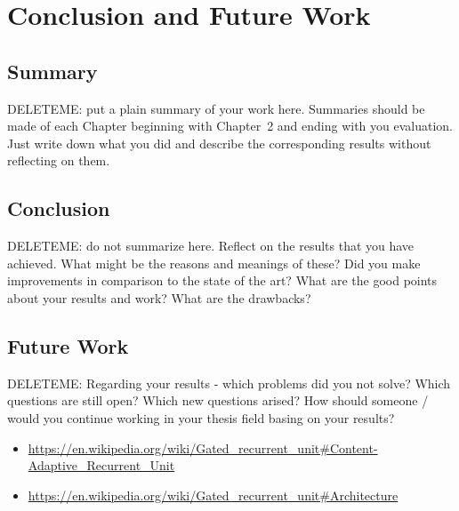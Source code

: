 \chapter{Conclusion and Future Work}
\label{conclusion}
\section{Summary}
DELETEME: put a plain summary of your work here. Summaries should be made of each Chapter beginning with Chapter~2 and ending with you evaluation. Just write down what you did and describe the corresponding results without reflecting on them.

\section{Conclusion}
DELETEME: do not summarize here. Reflect on the results that you have achieved. What might be the reasons and meanings of these? Did you make improvements in comparison to the state of the art? What are the good points about your results and work? What are the drawbacks? 

\section{Future Work}
DELETEME: Regarding your results - which problems did you not solve? Which questions are still open? Which new questions arised? How should someone / would you continue working in your thesis field basing on your results?

\begin{itemize}
    \item \url{https://en.wikipedia.org/wiki/Gated_recurrent_unit#Content-Adaptive_Recurrent_Unit}
    \item \url{https://en.wikipedia.org/wiki/Gated_recurrent_unit#Architecture}
\end{itemize}